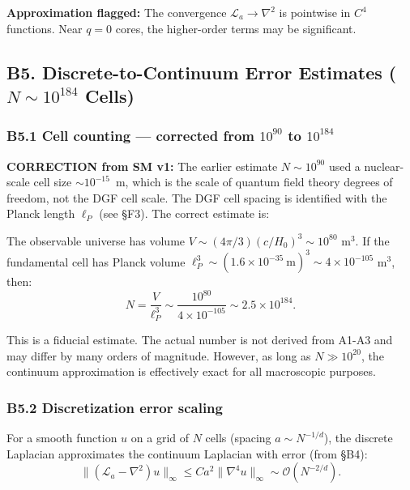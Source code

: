\documentclass[reprint]{revtex4-2}
\begin{document}
\textbf{Approximation flagged:} The convergence $\mathcal{L}_a \to \nabla^2$ is pointwise in $C^4$ functions. Near $q=0$ cores, the higher-order terms may be significant.

\subsection{B5. Discrete-to-Continuum Error Estimates ($N\sim 10^{184}$ Cells)}

\subsubsection{B5.1 Cell counting --- corrected from $10^{90}$ to $10^{184}$}

\textbf{CORRECTION from SM v1:} The earlier estimate $N\sim 10^{90}$ used a nuclear-scale cell size $\sim 10^{-15}$~m, which is the scale of quantum field theory degrees of freedom, not the DGF cell scale. The DGF cell spacing is identified with the Planck length $\ell_P$ (see \S F3). The correct estimate is:

The observable universe has volume $V \sim (4\pi/3)(c/H_0)^3 \sim 10^{80}$ m$^3$. If the fundamental cell has Planck volume $\ell_P^3 \sim (1.6\times 10^{-35}~\text{m})^3 \sim 4\times 10^{-105}$ m$^3$, then:
\begin{equation}
\boxed{N = \frac{V}{\ell_P^3} \sim \frac{10^{80}}{4\times 10^{-105}} \sim 2.5\times 10^{184}}.
\label{eq:N_estimate}
\end{equation}

This is a fiducial estimate. The actual number is not derived from A1-A3 and may differ by many orders of magnitude. However, as long as $N \gg 10^{20}$, the continuum approximation is effectively exact for all macroscopic purposes.

\subsubsection{B5.2 Discretization error scaling}

For a smooth function $u$ on a grid of $N$ cells (spacing $a \sim N^{-1/d}$), the discrete Laplacian approximates the continuum Laplacian with error (from \S B4):
\begin{equation}
\|(\mathcal{L}_a - \nabla^2)u\|_\infty \le C a^2 \|\nabla^4 u\|_\infty \sim \mathcal{O}(N^{-2/d}).
\end{equation}
\end{document}
